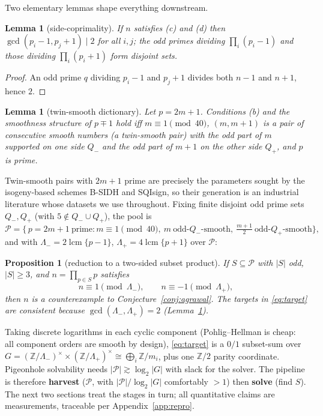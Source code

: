 \documentclass[11pt]{article}
\newtheorem{lemma}[theorem]{Lemma}
\newtheorem{proposition}[theorem]{Proposition}
\theoremstyle{remark}
\newcommand{\Z}{\mathbb{Z}}
\newcommand{\cP}{\mathcal{P}}
\DeclareMathOperator{\lcm}{lcm}
\begin{document}
Two elementary lemmas shape everything downstream.

\begin{lemma}[side-coprimality]\label{lem:sides}
If $n$ satisfies (c) and (d) then $\gcd(p_i - 1, p_j + 1) \mid 2$ for all
$i, j$; the odd primes dividing $\prod_i(p_i - 1)$ and those dividing
$\prod_i(p_i + 1)$ form disjoint sets.
\end{lemma}
\begin{proof}
An odd prime $q$ dividing $p_i - 1$ and $p_j + 1$ divides both $n - 1$ and
$n + 1$, hence $2$.
\end{proof}

\begin{lemma}[twin-smooth dictionary]\label{lem:dict}
Let $p = 2m + 1$. Conditions (b) and the smoothness structure of
$p \mp 1$ hold iff $m \equiv 1 \pmod{40}$, $(m, m+1)$ is a pair of
consecutive smooth numbers (a \emph{twin-smooth} pair) with the odd part
of $m$ supported on one side $Q_-$ and the odd part of $m + 1$ on the
other side $Q_+$, and $p$ is prime.
\end{lemma}

Twin-smooth pairs with $2m+1$ prime are precisely the parameters sought by
the isogeny-based schemes B-SIDH and SQIsign, so their generation is an
industrial literature \cite{CMN21,BCCEMNS23,BHLNV,MSW} whose datasets we
use throughout. Fixing finite disjoint odd prime sets $Q_-, Q_+$ (with
$5 \notin Q_- \cup Q_+$), the pool is
\[
\cP = \bigl\{\, p = 2m+1 \ \text{prime} : m \equiv 1 \!\!\!\pmod{40},\
m \ \text{odd-}Q_-\text{-smooth},\ \tfrac{m+1}{2}\
\text{odd-}Q_+\text{-smooth} \bigr\},
\]
and with $\Lambda_- = 2\lcm\{p - 1\}$, $\Lambda_+ = 4\lcm\{p + 1\}$ over
$\cP$:

\begin{proposition}[reduction to a two-sided subset product]
\label{prop:reduction}
If $S \subseteq \cP$ with $|S|$ odd, $|S| \ge 3$, and
$n = \prod_{p \in S} p$ satisfies
\begin{equation}\label{eq:target}
n \equiv 1 \pmod{\Lambda_-}, \qquad n \equiv -1 \pmod{\Lambda_+},
\end{equation}
then $n$ is a counterexample to Conjecture~\ref{conj:agrawal}. The targets
in \eqref{eq:target} are consistent because
$\gcd(\Lambda_-, \Lambda_+) = 2$ (Lemma~\ref{lem:sides}).
\end{proposition}

Taking discrete logarithms in each cyclic component (Pohlig--Hellman is
cheap: all component orders are smooth by design), \eqref{eq:target} is a
$0/1$ subset-sum over $G = (\Z/\Lambda_-)^\times \times
(\Z/\Lambda_+)^\times \cong \bigoplus_i \Z/m_i$, plus one $\Z/2$ parity
coordinate. Pigeonhole solvability needs $|\cP| \gtrsim \log_2|G|$ with
slack for the solver. The pipeline is therefore \textbf{harvest} ($\cP$,
with $|\cP| / \log_2|G|$ comfortably $> 1$) then \textbf{solve} (find
$S$). The next two sections treat the stages in turn; all quantitative
claims are measurements, traceable per Appendix~\ref{app:repro}.
\end{document}
